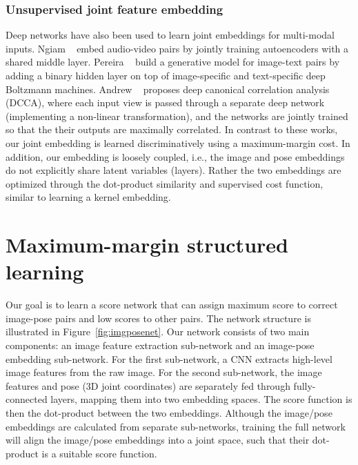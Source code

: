 \documentclass[10pt,twocolumn,letterpaper]{article}
\begin{document}
\vspace{-0.05in}
\subsubsection{Unsupervised joint feature embedding}

\vspace{-0.05in}
Deep networks have also been used to learn joint embeddings for multi-modal inputs. Ngiam \etal~\cite{multimodelDL2011} embed audio-video pairs by jointly training autoencoders  with a shared middle layer.
Pereira \etal~\cite{multimodelDBN2012} build a generative model for image-text pairs by adding a binary hidden layer on top of image-specific and text-specific deep Boltzmann machines.
%
Andrew \etal~\cite{DCCA} proposes deep canonical correlation analysis (DCCA), 
where each input view is passed through a separate deep network (implementing a non-linear transformation), 
and the networks are jointly trained so that the their outputs are maximally correlated.
%
In contrast to these works, our joint embedding is learned discriminatively using a maximum-margin cost.  In addition, our embedding is loosely coupled, i.e., the image and pose embeddings do not explicitly share latent variables (layers).  Rather the two embeddings are optimized through the dot-product similarity and supervised cost function, similar to learning a kernel embedding.
   

 
 \section{Maximum-margin structured learning}
\label{sec:structnet}
Our goal is to learn a score network that can assign maximum score to  correct image-pose pairs and low scores to other pairs.
%
The network structure is illustrated in Figure~\ref{fig:imgposenet}.
%
Our network consists of two main components: an image feature extraction sub-network and an image-pose embedding sub-network.
%
For the first sub-network, a CNN extracts high-level image features from the raw image.
For the second sub-network, 
the image features and pose (3D joint coordinates) are separately fed through fully-connected layers, mapping them into two embedding spaces. The score function is then the dot-product between the two embeddings.
Although the image/pose embeddings are calculated from separate sub-networks, training the full network will align the image/pose embeddings into a joint space, such that their dot-product is a suitable score function.
\end{document}
